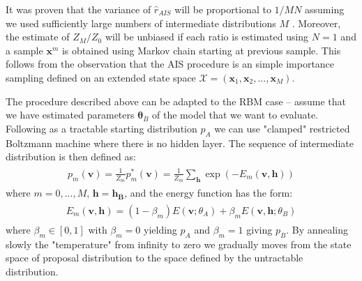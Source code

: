 It was proven that the variance of $\hat{r}_{AIS}$ will be proportional to $1 / MN$ assuming we used sufficiently large numbers of intermediate distributions $M$ \cite{neal2001annealed}. Moreover, the estimate of $Z_M / Z_0$ will be unbiased if each ratio is estimated using $N=1$ and a sample $\mathbf{x}^{m}$ is obtained using Markov chain starting at previous sample. This follows from the observation that the AIS procedure is an simple importance sampling defined on an extended state space $\mathcal{X} = (\mathbf{x}_1, \mathbf{x}_2, ..., \mathbf{x}_M)$.

The procedure described above can be adapted to the RBM case -- assume that we have estimated parameters $\mathbf{\theta}_B$ of the model that we want to evaluate. Following \cite{salakhutdinov2008quantitative} as a tractable starting distribution $p_A$ we can use "clamped" restricted Boltzmann machine where there is no hidden layer. The sequence of intermediate distribution is then defined as:
 \begin{align}
\begin{split}
p_m(\mathbf{v}) = \frac{1}{Z_m}p^*_m(\mathbf{v}) = \frac{1}{Z_m}\sum_\mathbf{h} \exp(-E_m(\mathbf{v, h}))
\end{split}
\end{align}
where $m = 0, ..., M$, $\mathbf{h} = \mathbf{h_B}$, and the energy function has the form:
 \begin{align}
\begin{split}
E_m(\mathbf{v,h}) = (1- \beta_m) E(\mathbf{v} ;\theta_A) + \beta_m E(\mathbf{v, h} ;\theta_B) 
\end{split}
\end{align}
where $\beta_m \in [0, 1]$ with $\beta_m = 0$ yielding $p_A$ and $\beta_m = 1$ giving $p_B$. By annealing slowly the "temperature" from infinity to zero we gradually moves from the state space of proposal distribution to the space defined by the untractable distribution.

